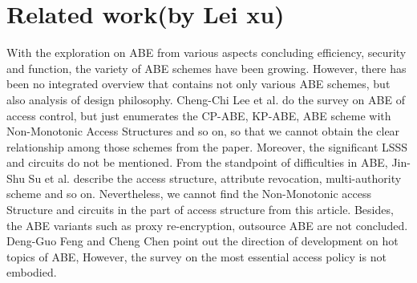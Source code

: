 \section{Related work(by Lei xu)}
With the exploration on ABE from various aspects concluding efficiency, security and function,
the variety of ABE schemes have been growing.
However, there has been no integrated overview that contains not only various ABE schemes,
but also analysis of design philosophy.
Cheng-Chi Lee et al. \cite{Lee:JNS'13} do the survey on ABE of access control,
but just enumerates the CP-ABE, KP-ABE, ABE scheme with Non-Monotonic Access Structures and so on,
so that we cannot obtain the clear relationship among those schemes from the paper.
Moreover, the significant LSSS and circuits do not be mentioned.
From the standpoint of difficulties in ABE,
Jin-Shu Su et al. \cite{Su:JS'11} describe the access structure, attribute revocation, multi-authority scheme and so on.
Nevertheless, we cannot find the Non-Monotonic access Structure and circuits in the part of access structure from this article.
Besides, the ABE variants such as proxy re-encryption, outsource ABE are not concluded.
Deng-Guo Feng and Cheng Chen \cite{Feng:jcr'14} point out the direction of development on hot topics of ABE,
However, the survey on the most essential access policy is not embodied.



